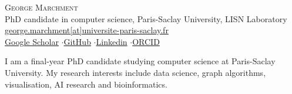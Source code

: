 \documentclass[10pt,a4paper]{article}
\begin{document}
\begin{center}
{\LARGE\scshape George Marchment}\\[1.2ex]
PhD candidate in computer science, Paris-Saclay University, LISN Laboratory\\[0.4ex]
\href{mailto:george.marchment@universite-paris-saclay.fr}{george.marchment[at]universite-paris-saclay.fr}\\[0.4ex]
\href{https://scholar.google.com/citations?user=KqPx4dkAAAAJ&hl=fr&oi=ao}{Google Scholar} \enspace$\cdot$\enspace \href{https://github.com/George-Marchment}{GitHub} \enspace$\cdot$\enspace \href{https://linkedin.com/in/george-marchment-9900ba1a9}{Linkedin} \enspace$\cdot$\enspace \href{https://orcid.org/0000-0002-4565-3940}{ORCID}
\end{center}

\medskip
I am a final-year PhD candidate studying computer science at Paris-Saclay University. My research interests include data science, graph algorithms, visualisation, AI research and bioinformatics.
\end{document}
